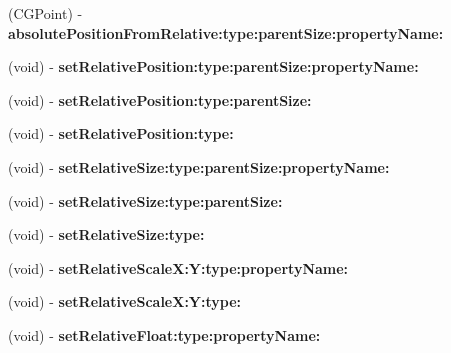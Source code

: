 \begin{DoxyCompactItemize}
\item 
\hypertarget{class_c_c_node_ad8bdd253feaba1a07ccee24e25e91b4b}{(C\-G\-Point) -\/ {\bfseries absolute\-Position\-From\-Relative\-:type\-:parent\-Size\-:property\-Name\-:}}\label{class_c_c_node_ad8bdd253feaba1a07ccee24e25e91b4b}

\item 
\hypertarget{class_c_c_node_a8b884fd372ef56322f5521987eddfedc}{(void) -\/ {\bfseries set\-Relative\-Position\-:type\-:parent\-Size\-:property\-Name\-:}}\label{class_c_c_node_a8b884fd372ef56322f5521987eddfedc}

\item 
\hypertarget{class_c_c_node_a65fb75104daed2d7ec5e71eb4fb5ee97}{(void) -\/ {\bfseries set\-Relative\-Position\-:type\-:parent\-Size\-:}}\label{class_c_c_node_a65fb75104daed2d7ec5e71eb4fb5ee97}

\item 
\hypertarget{class_c_c_node_a9122e05d77b835280893fd823719437d}{(void) -\/ {\bfseries set\-Relative\-Position\-:type\-:}}\label{class_c_c_node_a9122e05d77b835280893fd823719437d}

\item 
\hypertarget{class_c_c_node_a00c8379c1ef9530fdf3675d42ac87444}{(void) -\/ {\bfseries set\-Relative\-Size\-:type\-:parent\-Size\-:property\-Name\-:}}\label{class_c_c_node_a00c8379c1ef9530fdf3675d42ac87444}

\item 
\hypertarget{class_c_c_node_a2f441d725322541806e68a667cae23eb}{(void) -\/ {\bfseries set\-Relative\-Size\-:type\-:parent\-Size\-:}}\label{class_c_c_node_a2f441d725322541806e68a667cae23eb}

\item 
\hypertarget{class_c_c_node_a7830305f8843d9d13d17ac33b6742c3d}{(void) -\/ {\bfseries set\-Relative\-Size\-:type\-:}}\label{class_c_c_node_a7830305f8843d9d13d17ac33b6742c3d}

\item 
\hypertarget{class_c_c_node_af8d47bb6d1a039e2d8de44ba1cf2c41f}{(void) -\/ {\bfseries set\-Relative\-Scale\-X\-:\-Y\-:type\-:property\-Name\-:}}\label{class_c_c_node_af8d47bb6d1a039e2d8de44ba1cf2c41f}

\item 
\hypertarget{class_c_c_node_a1b97e191e5c88fc6b709b044454b482a}{(void) -\/ {\bfseries set\-Relative\-Scale\-X\-:\-Y\-:type\-:}}\label{class_c_c_node_a1b97e191e5c88fc6b709b044454b482a}

\item 
\hypertarget{class_c_c_node_a0d021d5fd3570df09407a07a69eee808}{(void) -\/ {\bfseries set\-Relative\-Float\-:type\-:property\-Name\-:}}\label{class_c_c_node_a0d021d5fd3570df09407a07a69eee808}


\end{DoxyCompactItemize}
